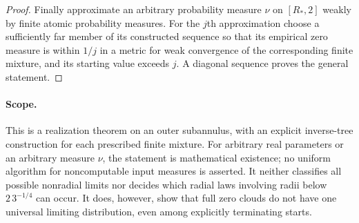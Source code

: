 \documentclass[11pt,a4paper]{article}
\theoremstyle{definition}
\theoremstyle{remark}
\numberwithin{equation}{section}
\begin{document}
\begin{proof}
Finally approximate an arbitrary probability measure $\nu$ on
$[R_*,2]$ weakly by finite atomic probability measures. For the
$j$th approximation choose a sufficiently far member of its
constructed sequence so that its empirical zero measure is within
$1/j$ in a metric for weak convergence of the corresponding finite
mixture, and its starting value exceeds $j$. A diagonal sequence
proves the general statement.
\end{proof}

\paragraph{Scope.}
This is a realization theorem on an outer subannulus, with an explicit
inverse-tree construction for each prescribed finite mixture. For
arbitrary real parameters or an arbitrary measure $\nu$, the statement
is mathematical existence; no uniform algorithm for noncomputable
input measures is asserted.
It neither classifies all possible nonradial limits nor decides which
radial laws involving radii below $2\,3^{-1/4}$ can occur. It does,
however, show that full zero clouds do not have one universal
limiting distribution, even among explicitly terminating starts.
\end{document}
